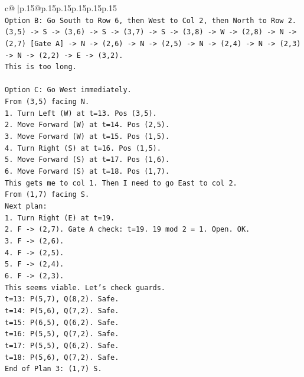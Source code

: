 \documentclass{article}
\begin{document}
{\begin{supertabular}{c@{$\;$}|p{.15\linewidth}@{}p{.15\linewidth}p{.15\linewidth}p{.15\linewidth}p{.15\linewidth}p{.15\linewidth}}
{{{\\ 
\texttt{Option B: Go South to Row 6, then West to Col 2, then North to Row 2.} \\
\texttt{(3,5) {-}> S {-}> (3,6) {-}> S {-}> (3,7) {-}> S {-}> (3,8) {-}> W {-}> (2,8) {-}> N {-}> (2,7) {[}Gate A{]} {-}> N {-}> (2,6) {-}> N {-}> (2,5) {-}> N {-}> (2,4) {-}> N {-}> (2,3) {-}> N {-}> (2,2) {-}> E {-}> (3,2).} \\
\texttt{This is too long.} \\
\\ 
\texttt{Option C: Go West immediately.} \\
\texttt{From (3,5) facing N.} \\
\texttt{1. Turn Left (W) at t=13. Pos (3,5).} \\
\texttt{2. Move Forward (W) at t=14. Pos (2,5).} \\
\texttt{3. Move Forward (W) at t=15. Pos (1,5).} \\
\texttt{4. Turn Right (S) at t=16. Pos (1,5).} \\
\texttt{5. Move Forward (S) at t=17. Pos (1,6).} \\
\texttt{6. Move Forward (S) at t=18. Pos (1,7).} \\
\texttt{This gets me to col 1. Then I need to go East to col 2.} \\
\texttt{From (1,7) facing S.} \\
\texttt{Next plan:} \\
\texttt{1. Turn Right (E) at t=19.} \\
\texttt{2. F {-}> (2,7). Gate A check: t=19. 19 mod 2 = 1. Open. OK.} \\
\texttt{3. F {-}> (2,6).} \\
\texttt{4. F {-}> (2,5).} \\
\texttt{5. F {-}> (2,4).} \\
\texttt{6. F {-}> (2,3).} \\
\texttt{This seems viable. Let's check guards.} \\
\texttt{t=13: P(5,7), Q(8,2). Safe.} \\
\texttt{t=14: P(5,6), Q(7,2). Safe.} \\
\texttt{t=15: P(6,5), Q(6,2). Safe.} \\
\texttt{t=16: P(5,5), Q(7,2). Safe.} \\
\texttt{t=17: P(5,5), Q(6,2). Safe.} \\
\texttt{t=18: P(5,6), Q(7,2). Safe.} \\
\texttt{End of Plan 3: (1,7) S.} \\
}}}
\end{supertabular}}
\end{document}
